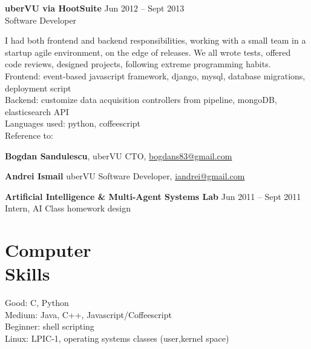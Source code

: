 \documentclass[margin,line]{resume}
\begin{document}
\begin{resume}
	\vspace{1.2mm}\textbf{uberVU via HootSuite}
		\hfill Jun 2012 -- Sept 2013\vspace{1mm}\\
		Software Developer\vspace{1.2mm}\\
    {\fontsize{2.65mm}{1em}\selectfont
      I had both frontend and backend responsibilities, working with a small team in a startup agile environment, on the edge of releases. We all wrote tests, offered code reviews, designed projects, following extreme programming habits.\vspace{1.2mm}\\
      Frontend: event-based javascript framework, django, mysql, database migrations, deployment script\vspace{1.2mm}\\
      Backend: customize data acquisition controllers from pipeline, mongoDB, elasticsearch API\vspace{1.2mm}\\
      Languages used: python, coffeescript\vspace{1.2mm}\\
      Reference to:
      \begin{list2}
          \item \textbf{Bogdan Sandulescu}, uberVU CTO, \href{mailto:bogdans83@gmail.com}{bogdans83@gmail.com}
          \item \textbf{Andrei Ismail} uberVU Software Developer, \href{mailto:iandrei@gmail.com}{iandrei@gmail.com}
      \end{list2}
    }

	\vspace{1.2mm}\textbf{Artificial Intelligence \& Multi-Agent Systems Lab}
		\hfill Jun 2011 -- Sept 2011\vspace{1mm}\\
		Intern, AI Class homework design
    \section{\mysidestyle Computer\\Skills}

    Good: C, Python								\\
    Medium: Java, C++, Javascript/Coffeescript	\\
    Beginner: shell scripting					\\
	Linux: LPIC-1, operating systems classes (user,kernel space)


\end{resume}
\end{document}
